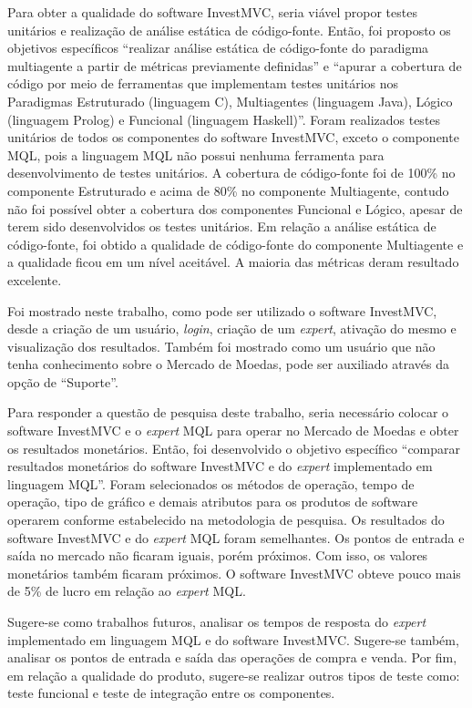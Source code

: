 Para obter a qualidade do software InvestMVC, seria viável propor testes unitários e realização de análise estática de código-fonte. Então, foi proposto os objetivos específicos “realizar análise estática de código-fonte do paradigma multiagente a partir de métricas previamente definidas” e “apurar a cobertura de código por meio de ferramentas que implementam testes unitários nos Paradigmas Estruturado (linguagem C), Multiagentes (linguagem Java), Lógico (linguagem Prolog) e Funcional (linguagem Haskell)”. Foram realizados testes unitários de todos os componentes do software InvestMVC, exceto o componente MQL, pois a linguagem MQL não possui nenhuma ferramenta para desenvolvimento de testes unitários. A cobertura de código-fonte foi de 100\% no componente Estruturado e acima de 80\% no componente Multiagente, contudo não foi possível obter a cobertura dos componentes Funcional e Lógico, apesar de terem sido desenvolvidos os testes unitários. Em relação a análise estática de código-fonte, foi obtido a qualidade de código-fonte do componente Multiagente e a qualidade ficou em um nível aceitável. A maioria das métricas deram resultado excelente.

Foi mostrado neste trabalho, como pode ser utilizado o software InvestMVC, desde a criação de um usuário, \textit{login}, criação de um \textit{expert}, ativação do mesmo e visualização dos resultados. Também foi mostrado como um usuário que não tenha conhecimento sobre o Mercado de Moedas, pode ser auxiliado através da opção de “Suporte”. 

Para responder a questão de pesquisa deste trabalho, seria necessário colocar o software InvestMVC e o \textit{expert} MQL para operar no Mercado de Moedas e obter os resultados monetários. Então, foi desenvolvido o objetivo específico “comparar resultados monetários do software InvestMVC e do \textit{expert} implementado em linguagem MQL”. Foram selecionados os métodos de operação, tempo de operação, tipo de gráfico e demais atributos para os produtos de software operarem conforme estabelecido na metodologia de pesquisa. Os resultados do software InvestMVC e do \textit{expert} MQL foram semelhantes. Os pontos de entrada e saída no mercado não ficaram iguais, porém próximos. Com isso, os valores monetários também ficaram próximos. O software InvestMVC obteve pouco mais de 5\% de lucro em relação ao \textit{expert} MQL.

Sugere-se como trabalhos futuros, analisar os tempos de resposta do \textit{expert} implementado em linguagem MQL e do software InvestMVC. Sugere-se também, analisar os pontos de entrada e saída das operações de compra e venda. Por fim, em relação a qualidade do produto, sugere-se realizar outros tipos de teste como:  teste funcional e teste de integração entre os componentes.

